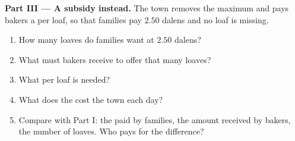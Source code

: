 \begin{problem}
\medskip
\noindent\textbf{Part III --- A subsidy instead.} The town removes the maximum  and pays bakers a
 per loaf, so that families pay $2.50$ dalens and no loaf is missing.
\begin{enumerate}[resume]
  \item How many loaves do families want at $2.50$ dalens?
  \item What  must bakers receive to offer that many loaves?
  \item What  per loaf is needed?
  \item What does the  cost the town each day?
  \item Compare with Part I: the  paid by families, the amount received by bakers, the number of
        loaves. Who pays for the difference?
\end{enumerate}
\end{problem}
